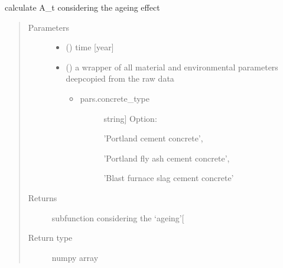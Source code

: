 \documentclass[letterpaper,10pt,english]{sphinxmanual}
\begin{document}
\begin{fulllineitems}
\label{\detokenize{chloride:chloride.A_t}}
\sphinxAtStartPar
calculate A\_t considering the ageing effect
\begin{quote}\begin{description}
\item[{Parameters}] \leavevmode\begin{itemize}
\item {} 
\sphinxAtStartPar
{} (\sphinxstyleliteralemphasis{\sphinxupquote{, }}) \textendash{} time {[}year{]}

\item {} 
\sphinxAtStartPar
{} () \textendash{} 
\sphinxAtStartPar
a wrapper of all material and environmental parameters deep\sphinxhyphen{}copied from the raw data
\begin{itemize}
\item {} \begin{description}
\item[{pars.concrete\_type}] \leavevmode{[}string{]}
\sphinxAtStartPar
Option:

\sphinxAtStartPar
’Portland cement concrete’,

\sphinxAtStartPar
’Portland fly ash cement concrete’,

\sphinxAtStartPar
’Blast furnace slag cement concrete’

\end{description}

\end{itemize}


\end{itemize}

\item[{Returns}] \leavevmode
\sphinxAtStartPar
{} \textendash{} subfunction considering the ‘ageing’{[}\sphinxhyphen{}{]}

\item[{Return type}] \leavevmode
\sphinxAtStartPar
numpy array

\end{description}\end{quote}


\end{fulllineitems}
\end{document}
